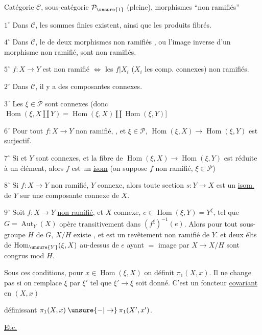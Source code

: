 Catégorie $\mathcal C$, sous-catégorie $\mathcal P_{\unsure{1}}$ (pleine), morphismes ``non ramifiés''

\uline{$1^\circ$} Dans $\mathcal C$, les sommes finies existent, ainsi que les produits fibrés.

\uline{$4^\circ$} Dans $\mathcal C$, le  de deux morphismes non ramifiés , ou l'image inverse d'un morphisme non ramifié, sont non ramifiés.

\uline{$5^\circ$}  $f:X\to Y$ est non ramifié $\Longleftrightarrow$ les $f|X_i$ ($X_i$ les comp. connexes)  non ramifiés.

\uline{$2^\circ$} Dans $\mathcal C$, il y a des composantes connexes.

\uline{$3^\circ$} Les  $\xi\in\mathcal P$ sont connexes
(donc $\operatorname{Hom}(\xi,X\amalg Y)=\operatorname{Hom}(\xi,X)\amalg\operatorname{Hom}(\xi,Y)$]

\uline{$6^\circ$} Pour tout $f:X\to Y$ non ramifié, , et $\xi\in\mathcal P$,
$\operatorname{Hom}(\xi,X)\to\operatorname{Hom}(\xi,Y)$ est \uline{surjectif}.

\uline{$7^\circ$} Si  et $Y$ sont connexes, et la fibre de
$\operatorname{Hom}(\xi,X)\to\operatorname{Hom}(\xi,Y)$ est réduite à un élément, alors $f$ est un \uline{isom}
(on suppose $f$ non ramifié, $\xi\in\mathcal P$)

\uline{$8^\circ$} Si $f:X\to Y$ non ramifié, $Y$ connexe, alors  toute  section $s:Y\to X$ est un \uline{isom.} de $Y$ sur une composante connexe de $X$.

\uline{$9^\circ$} Soit 
$f:X\to Y$ \uline{non ramifié}, et $X$ connexe, \unsure{$\xi\in$} $e\in\operatorname{Hom}(\xi,Y)=Y^\xi$, tel que $G=\operatorname{Aut}_Y(X)$ opère transitivement dans $(f^\xi)^{-1}(e)$.
Alors pour tout sous-groupe $H$ de $G$, $X/H$ existe , et est un revêtement non ramifié de $Y$.
et deux élts de $\operatorname{Hom}_{\unsure{Y}}(\xi,X)$ au-dessus de $e$ ayant $=$ image par $X\to X/H$ sont congrus mod $H$.

Sous ces conditions, pour $x\in\operatorname{Hom}(\xi,X)$ on définit $\pi_1(X,x)$.
Il ne change pas si on remplace $\xi$ par $\xi'$ tel que $\xi'\to\xi$ soit donné.
C'est un foncteur \uline{covariant} en $(X,x)$

définissant $\pi_1(X,x)\mathbin{\unsure{-|\to}}\pi_1(X',x')$.

\uline{Etc.}
